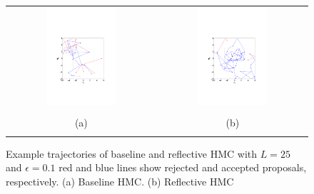 \documentclass{article} %
\begin{document}
\begin{figure}
\setlength{\tabcolsep}{0em}
\vspace{-1mm}
\begin{center}
\begin{tabular}{cc}
\includegraphics[trim={3.2cm 6cm 3.2cm 9cm},clip,width=0.49\textwidth]{../plots3/BaselineHMC_l25_eps0_1_log_scatter2D.pdf} 
&\includegraphics[trim={3.2cm 6cm 3cm 9cm},clip,width=0.49\textwidth]{../plots3/ReflectiveHMC_l25_eps0_1_log_scatter2D.pdf}  \\
\vspace{-3.5mm}
\\
   \footnotesize(a) 
& \footnotesize(b) 
\\
\multicolumn{2}{c}{}
\end{tabular}
\end{center}
\vspace{-8mm}
\caption{\footnotesize
Example trajectories of baseline and reflective HMC with $L=25$ and $\epsilon=0.1$ red and blue lines show rejected and accepted proposals, respectively. (a) Baseline HMC. (b) Reflective HMC}
\vspace{-10pt}
\end{figure}
\end{document}
